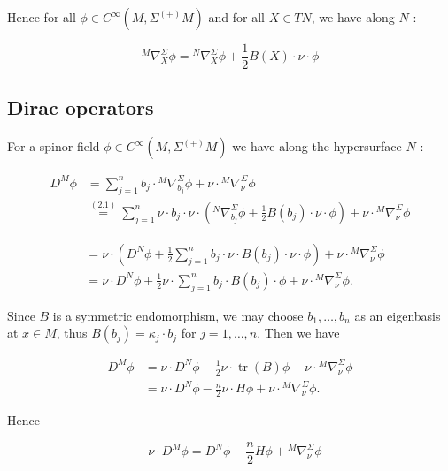 \documentclass[10pt, letterpaper]{article}
\begin{document}
Hence for all $\phi \in C^{\infty}\left(M, \Sigma^{(+)} M\right)$ and for all $X \in T N$, we have along $N$ :

$$
{ }^{M} \nabla_{X}^{\Sigma} \phi={ }^{N} \nabla_{X}^{\Sigma} \phi+\frac{1}{2} B(X) \cdot \nu \cdot \phi
$$



\pagebreak


\subsection{Dirac operators}
For a spinor field $\phi \in C^{\infty}\left(M, \Sigma^{(+)} M\right)$ we have along the hypersurface $N$ :

$$
\begin{aligned}
D^{M} \phi & =\sum_{j=1}^{n} b_{j} \cdot{ }^{M} \nabla_{b_{j}}^{\Sigma} \phi+\nu \cdot{ }^{M} \nabla_{\nu}^{\Sigma} \phi \\
& \stackrel{(2.1)}{=} \sum_{j=1}^{n} \nu \cdot b_{j} \cdot \nu \cdot\left({ }^{N} \nabla_{b_{j}}^{\Sigma} \phi+\frac{1}{2} B\left(b_{j}\right) \cdot \nu \cdot \phi\right)+\nu \cdot{ }^{M} \nabla_{\nu}^{\Sigma} \phi
\end{aligned}
$$

$$
\begin{aligned}
& =\nu \cdot\left(D^{N} \phi+\frac{1}{2} \sum_{j=1}^{n} b_{j} \cdot \nu \cdot B\left(b_{j}\right) \cdot \nu \cdot \phi\right)+\nu \cdot{ }^{M} \nabla_{\nu}^{\Sigma} \phi \\
& =\nu \cdot D^{N} \phi+\frac{1}{2} \nu \cdot \sum_{j=1}^{n} b_{j} \cdot B\left(b_{j}\right) \cdot \phi+\nu \cdot{ }^{M} \nabla_{\nu}^{\Sigma} \phi .
\end{aligned}
$$

Since $B$ is a symmetric endomorphism, we may choose $b_{1}, \ldots, b_{n}$ as an eigenbasis at $x \in M$, thus $B\left(b_{j}\right)=\kappa_{j} \cdot b_{j}$ for $j=1, \ldots, n$. Then we have

$$
\begin{aligned}
D^{M} \phi & =\nu \cdot D^{N} \phi-\frac{1}{2} \nu \cdot \operatorname{tr}(B) \phi+\nu \cdot{ }^{M} \nabla_{\nu}^{\Sigma} \phi \\
& =\nu \cdot D^{N} \phi-\frac{n}{2} \nu \cdot H \phi+\nu \cdot{ }^{M} \nabla_{\nu}^{\Sigma} \phi .
\end{aligned}
$$

Hence

$$
-\nu \cdot D^{M} \phi=D^{N} \phi-\frac{n}{2} H \phi+{ }^{M} \nabla_{\nu}^{\Sigma} \phi
$$
\end{document}

